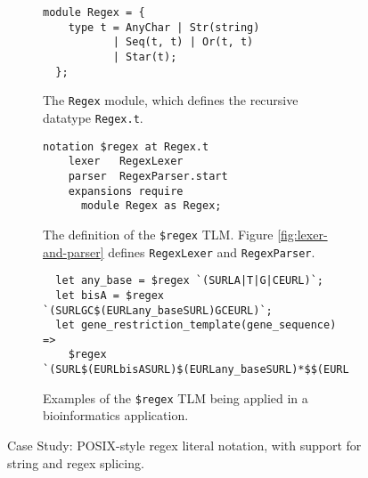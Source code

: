 \documentclass[acmsmall,review,anonymous]{acmart}\settopmatter{printfolios=true,printccs=false,printacmref=false}
\newcommand{\li}[1]{\lstinline[basicstyle=\ttfamily\fontsize{9pt}{1em}\selectfont]{#1}}
\begin{document}
\begin{figure}[t]
\begin{subfigure}[t]{0.45\textwidth}
\begin{lstlisting}[mathescape=~]
  module Regex = {
    type t = AnyChar | Str(string)
           | Seq(t, t) | Or(t, t) 
           | Star(t);
  };
\end{lstlisting}
\vspace{-5px}
\caption{The \li{Regex} module, which defines the recursive datatype \li{Regex.t}.}
\label{fig:Regex-module-def}
\end{subfigure}
\hfill
\begin{subfigure}[t]{0.53\textwidth}
\begin{lstlisting}[mathescape=|]
  notation $regex at Regex.t
    lexer   RegexLexer
    parser  RegexParser.start
    expansions require
      module Regex as Regex;
\end{lstlisting}
\vspace{-5px}
\caption{The definition of the \li{$regex} TLM. Figure \ref{fig:lexer-and-parser} defines \li{RegexLexer} and \li{RegexParser}.}
\label{fig:regex-tlm-def}
\end{subfigure}

\begin{subfigure}[t]{\textwidth}
\vspace{4px}
\begin{lstlisting}
  let any_base = $regex `(SURLA|T|G|CEURL)`;
  let bisA = $regex `(SURLGC$(EURLany_baseSURL)GCEURL)`;
  let gene_restriction_template(gene_sequence) => 
    $regex `(SURL$(EURLbisASURL)$(EURLany_baseSURL)*$$(EURLgene_sequenceSURL)$(EURLany_baseSURL)*$(EURLbisASURL)EURL)`
\end{lstlisting}
\vspace{-5px}
\caption{Examples of the \li{$regex} TLM being applied in a bioinformatics application. %
}
\label{fig:first-tlm-example}
\end{subfigure}
\vspace{3px}
\caption{Case Study: POSIX-style regex literal notation, with support for string and regex splicing.}
\vspace{-3px}
\end{figure}
\end{document}
